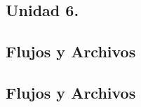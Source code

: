 \documentclass[letterpaper, 12pt]{article}
\begin{document}
    \newpage
    \justify
    \begin{huge}
        \bigbreak
        \bigbreak
        \bigbreak
        \section*{\huge{Unidad 6.}}
        \subsection*{\huge{Flujos y Archivos}}
    \end{huge}     

    \newpage
    \begin{justify}
        \section{Flujos y Archivos}

\end{justify}
\end{document}
